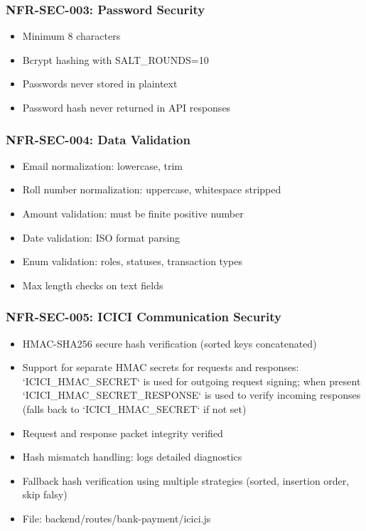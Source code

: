\documentclass[12pt,a4paper]{article}
\begin{document}
\subsubsection{NFR-SEC-003: Password Security}
\begin{itemize}
  \item Minimum 8 characters
  \item Bcrypt hashing with SALT\_ROUNDS=10
  \item Passwords never stored in plaintext
  \item Password hash never returned in API responses
\end{itemize}

\subsubsection{NFR-SEC-004: Data Validation}
\begin{itemize}
  \item Email normalization: lowercase, trim
  \item Roll number normalization: uppercase, whitespace stripped
  \item Amount validation: must be finite positive number
  \item Date validation: ISO format parsing
  \item Enum validation: roles, statuses, transaction types
  \item Max length checks on text fields
\end{itemize}

\subsubsection{NFR-SEC-005: ICICI Communication Security}
\begin{itemize}
  \item HMAC-SHA256 secure hash verification (sorted keys concatenated)
  \item Support for separate HMAC secrets for requests and responses: `ICICI_HMAC_SECRET` is used for outgoing request signing; when present `ICICI_HMAC_SECRET_RESPONSE` is used to verify incoming responses (falls back to `ICICI_HMAC_SECRET` if not set)
  \item Request and response packet integrity verified
  \item Hash mismatch handling: logs detailed diagnostics
  \item Fallback hash verification using multiple strategies (sorted, insertion order, skip falsy)
  \item File: backend/routes/bank-payment/icici.js
\end{itemize}
\end{document}
